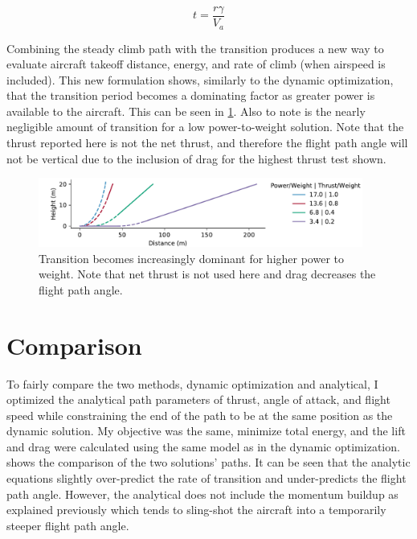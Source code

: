 \documentclass[10pt,english]{article}
\begin{document}
\begin{equation}
\label{eq:t}
t = \frac{r \gamma}{V_a}
\end{equation}

\vspace{10pt}
Combining the steady climb path with the transition produces a new way to evaluate aircraft takeoff distance, energy, and rate of climb (when airspeed is included).  This new formulation shows, similarly to the dynamic optimization, that the transition period becomes a dominating factor as greater power is available to the aircraft.  This can be seen in \cref{f:analytical_takeoff}.   Also to note is the nearly negligible amount of transition for a low power-to-weight solution. Note that the thrust reported here is not the net thrust, and therefore the flight path angle will not be vertical due to the inclusion of drag for the highest thrust test shown.
\vspace{10pt}

\begin{figure}[H]
\centering
\includegraphics[trim={.6cm 0.0cm .1cm 0cm},clip,width=0.95\textwidth]{position}
\caption{Transition becomes increasingly dominant for higher power to weight.  Note that net thrust is not used here and drag decreases the flight path angle.}
\label{f:analytical_takeoff}
\end{figure}




\section{Comparison}

To fairly compare the two methods, dynamic optimization and analytical, I optimized the analytical path parameters of thrust, angle of attack, and flight speed while constraining the end of the path to be at the same position as the dynamic solution.  My objective was the same, minimize total energy, and the lift and drag were calculated using the same model as in the dynamic optimization.   shows the comparison of the two solutions' paths.  It can be seen that the analytic equations slightly over-predict the rate of transition and under-predicts the flight path angle.  However, the analytical does not include the momentum buildup as explained previously which tends to sling-shot the aircraft into a temporarily steeper flight path angle.
\end{document}
